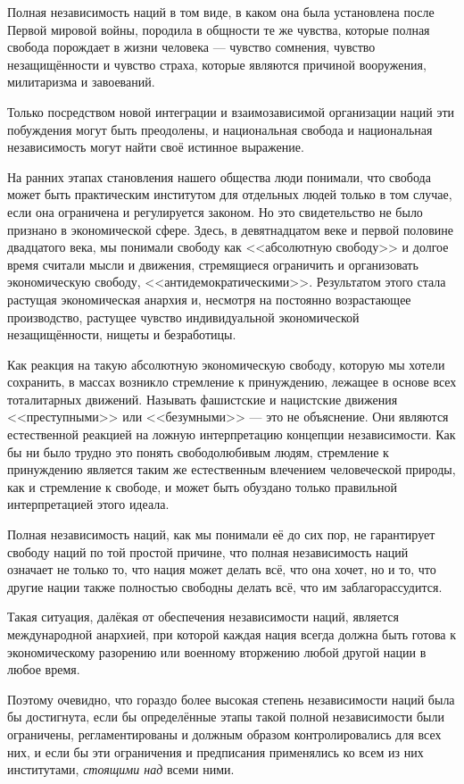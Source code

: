 Полная независимость наций в том виде, в каком она была установлена после Первой мировой войны, породила в общности те же чувства, которые полная свобода порождает в жизни человека — чувство сомнения, чувство незащищённости и чувство страха, которые являются причиной вооружения, милитаризма и завоеваний.

Только посредством новой интеграции и взаимозависимой организации наций эти побуждения могут быть преодолены, и национальная свобода и национальная независимость могут найти своё истинное выражение.

На ранних этапах становления нашего общества люди понимали, что свобода может быть практическим институтом для отдельных людей только в том случае, если она ограничена и регулируется законом. Но это свидетельство не было признано в экономической сфере. Здесь, в девятнадцатом веке и первой половине двадцатого века, мы понимали свободу как <<абсолютную свободу>> и долгое время считали мысли и движения, стремящиеся ограничить и организовать экономическую свободу, <<антидемократическими>>. Результатом этого стала растущая экономическая анархия и, несмотря на постоянно возрастающее производство, растущее чувство индивидуальной экономической незащищённости, нищеты и безработицы.

Как реакция на такую абсолютную экономическую свободу, которую мы хотели сохранить, в массах возникло стремление к принуждению, лежащее в основе всех тоталитарных движений. Называть фашистские и нацистские движения <<преступными>> или <<безумными>> — это не объяснение. Они являются естественной реакцией на ложную интерпретацию концепции независимости. Как бы ни было трудно это понять свободолюбивым людям, стремление к принуждению является таким же естественным влечением человеческой природы, как и стремление к свободе, и может быть обуздано только правильной интерпретацией этого идеала.

Полная независимость наций, как мы понимали её до сих пор, не гарантирует свободу наций по той простой причине, что полная независимость наций означает не только то, что нация может делать всё, что она хочет, но и то, что другие нации также полностью свободны делать всё, что им заблагорассудится.

Такая ситуация, далёкая от обеспечения независимости наций, является международной анархией, при которой каждая нация всегда должна быть готова к экономическому разорению или военному вторжению любой другой нации в любое время.

Поэтому очевидно, что гораздо более высокая степень независимости наций была бы достигнута, если бы определённые этапы такой полной независимости были ограничены, регламентированы и должным образом контролировались для всех них, и если бы эти ограничения и предписания применялись ко всем из них институтами, \textit{стоящими над} всеми ними.

